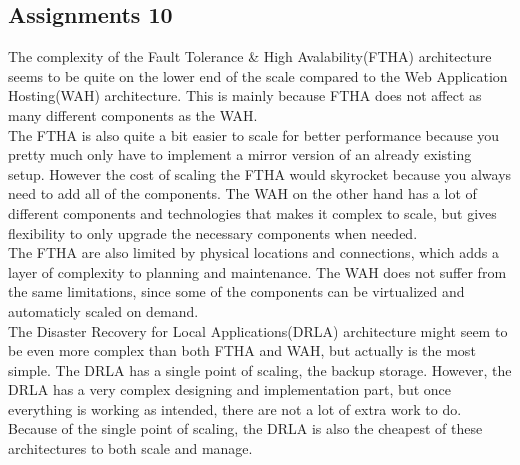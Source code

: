 \subsection{Assignments 10}  The complexity of the Fault Tolerance \& High Avalability(FTHA) architecture seems to be quite on the lower end of the scale compared to the Web Application Hosting(WAH) architecture. This is mainly because FTHA does not affect as many different components as the WAH. \\
The FTHA is also quite a bit easier to scale for better performance because you pretty much only have to implement a mirror version of an already existing setup. However the cost of scaling the FTHA would skyrocket because you always need to add all of the components. The WAH on the other hand has a lot of different components and technologies that makes it complex to scale, but gives flexibility to only upgrade the necessary components when needed. \\
The FTHA are also limited by physical locations and connections, which adds a layer of complexity to planning and maintenance. The WAH does not suffer from the same limitations, since some of the components can be virtualized and automaticly scaled on demand.\\
The Disaster Recovery for Local Applications(DRLA) architecture might seem to be even more complex than both FTHA and WAH, but actually is the most simple. The DRLA has a single point of scaling, the backup storage. However, the DRLA has a very complex designing and implementation part, but once everything is working as intended, there are not a lot of extra work to do. Because of the single point of scaling, the DRLA is also the cheapest of these architectures to both scale and manage.


